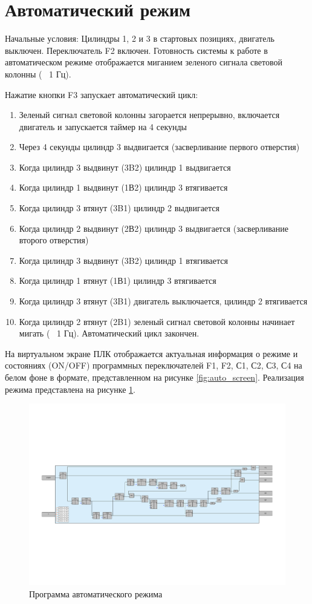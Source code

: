 \newpage
\section{Автоматический режим}
Начальные условия: Цилиндры 1, 2 и 3 в стартовых позициях, двигатель
выключен. Переключатель F2 включен. Готовность системы к работе в
автоматическом режиме отображается миганием зеленого сигнала световой
колонны (~ 1 Гц).

Нажатие кнопки F3 запускает автоматический цикл:
\begin{enumerate}
    \item Зеленый сигнал световой колонны загорается непрерывно, включается двигатель и запускается таймер на 4 секунды
    \item Через 4 секунды цилиндр 3 выдвигается (засверливание первого отверстия)
    \item Когда цилиндр 3 выдвинут (3B2) цилиндр 1 выдвигается
    \item Когда цилиндр 1 выдвинут (1В2) цилиндр 3 втягивается
    \item Когда цилиндр 3 втянут (3B1) цилиндр 2 выдвигается
    \item Когда цилиндр 2 выдвинут (2В2) цилиндр 3 выдвигается (засверливание второго отверстия)
    \item Когда цилиндр 3 выдвинут (3B2) цилиндр 1 втягивается
    \item Когда цилиндр 1 втянут (1В1) цилиндр 3 втягивается
    \item Когда цилиндр 3 втянут (3B1) двигатель выключается, цилиндр 2 втягивается
    \item Когда цилиндр 2 втянут (2B1) зеленый сигнал световой колонны начинает мигать (~ 1 Гц). Автоматический цикл закончен.
\end{enumerate}

На виртуальном экране ПЛК отображается актуальная информация о
режиме и состояниях (ON/OFF) программных переключателей F1, F2, С1, С2,
С3, С4 на белом фоне в формате, представленном на рисунке \ref{fig:auto_screen}.
Реализация режима представлена на рисунке \ref{fig:auto_mode}.

\begin{figure}[pt]
    \centering
    \includegraphics[scale=0.5]{fig/auto_mode.pdf}
    \caption{Программа автоматического режима}
    \label{fig:auto_mode}
\end{figure}

